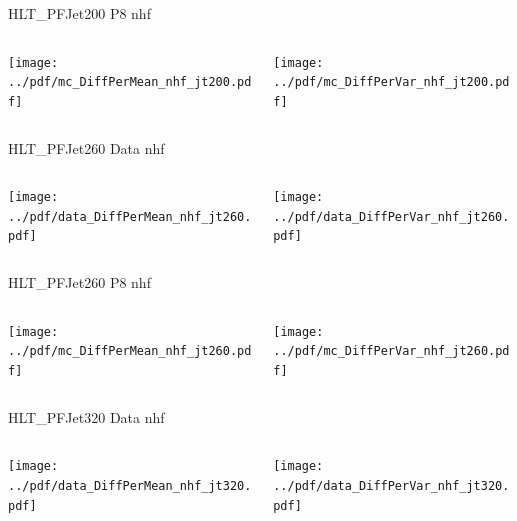 \documentclass[9pt]{beamer}
\begin{document}
\begin{frame}[t]{HLT\_PFJet200 P8 nhf}
\begin{columns}[T]
  \begin{column}{.5\textwidth}
  \texttt{[image: ../pdf/mc\_DiffPerMean\_nhf\_jt200.pdf]}
  \end{column}
  \begin{column}{.5\textwidth}
  \texttt{[image: ../pdf/mc\_DiffPerVar\_nhf\_jt200.pdf]}
  \end{column}
\end{columns}
\end{frame}

\begin{frame}[t]{HLT\_PFJet260 Data nhf}
\begin{columns}[T]
  \begin{column}{.5\textwidth}
  \texttt{[image: ../pdf/data\_DiffPerMean\_nhf\_jt260.pdf]}
  \end{column}
  \begin{column}{.5\textwidth}
  \texttt{[image: ../pdf/data\_DiffPerVar\_nhf\_jt260.pdf]}
  \end{column}
\end{columns}
\end{frame}

\begin{frame}[t]{HLT\_PFJet260 P8 nhf}
\begin{columns}[T]
  \begin{column}{.5\textwidth}
  \texttt{[image: ../pdf/mc\_DiffPerMean\_nhf\_jt260.pdf]}
  \end{column}
  \begin{column}{.5\textwidth}
  \texttt{[image: ../pdf/mc\_DiffPerVar\_nhf\_jt260.pdf]}
  \end{column}
\end{columns}
\end{frame}

\begin{frame}[t]{HLT\_PFJet320 Data nhf}
\begin{columns}[T]
  \begin{column}{.5\textwidth}
  \texttt{[image: ../pdf/data\_DiffPerMean\_nhf\_jt320.pdf]}
  \end{column}
  \begin{column}{.5\textwidth}
  \texttt{[image: ../pdf/data\_DiffPerVar\_nhf\_jt320.pdf]}
  \end{column}
\end{columns}
\end{frame}
\end{document}

